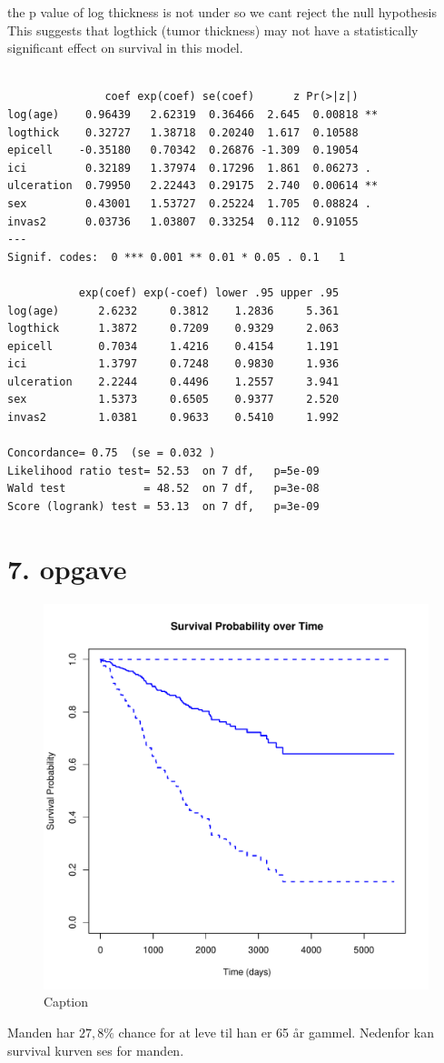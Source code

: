 the p value of log thickness is not under so we cant reject the null hypothesis
This suggests that logthick (tumor thickness) may not have a statistically
significant effect on survival in this model.
\begin{lstlisting}
    
               coef exp(coef) se(coef)      z Pr(>|z|)   
log(age)    0.96439   2.62319  0.36466  2.645  0.00818 **
logthick    0.32727   1.38718  0.20240  1.617  0.10588   
epicell    -0.35180   0.70342  0.26876 -1.309  0.19054   
ici         0.32189   1.37974  0.17296  1.861  0.06273 . 
ulceration  0.79950   2.22443  0.29175  2.740  0.00614 **
sex         0.43001   1.53727  0.25224  1.705  0.08824 . 
invas2      0.03736   1.03807  0.33254  0.112  0.91055   
---
Signif. codes:  0 *** 0.001 ** 0.01 * 0.05 . 0.1   1

           exp(coef) exp(-coef) lower .95 upper .95
log(age)      2.6232     0.3812    1.2836     5.361
logthick      1.3872     0.7209    0.9329     2.063
epicell       0.7034     1.4216    0.4154     1.191
ici           1.3797     0.7248    0.9830     1.936
ulceration    2.2244     0.4496    1.2557     3.941
sex           1.5373     0.6505    0.9377     2.520
invas2        1.0381     0.9633    0.5410     1.992

Concordance= 0.75  (se = 0.032 )
Likelihood ratio test= 52.53  on 7 df,   p=5e-09
Wald test            = 48.52  on 7 df,   p=3e-08
Score (logrank) test = 53.13  on 7 df,   p=3e-09
\end{lstlisting}

\chapter{7. opgave}
\begin{figure}[h]
    \centering
    \includegraphics[width=0.5\linewidth]{Basses_kode/Billeder_duration/survival_curve_man_57.pdf}
    \caption{Caption}
\end{figure}
Manden har $27,8\%$ chance for at leve til han er 65 år gammel. 
Nedenfor kan survival kurven ses for manden.


